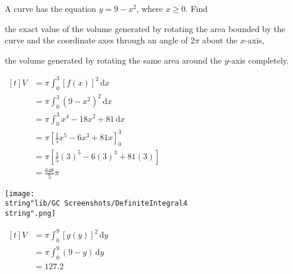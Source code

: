 \documentclass[11pt,a4paper]{book}
\begin{document}
\begin{example}

A curve has the equation $y=9-x^{2}$, where $x\geq0$. Find

\begin{tasks}[label=(\alph*),label-width=3.5ex]

\task the exact value of the volume generated by rotating the area
bounded by the curve and the coordinate axes through an angle of $2\pi$
about the $x$-axis,

\task the volume generated by rotating the same area around the $y$-axis
completely.

\end{tasks}

\Solution

\begin{tasks}[label=(\alph*),label-width=3.5ex]

\task
\begin{minipage}[t]{0.4\textwidth}
$
\begin{aligned}[t]
V & =\pi\int_{0}^{3}\left[f(x)\right]^{2}\,\mathrm{d}x\\
 & =\pi\int_{0}^{3}(9-x^{2})^{2}\,\mathrm{d}x\\
 & =\pi\int_{0}^{3}x^{4}-18x^{2}+81\,\mathrm{d}x\\
 & =\pi\left[\frac{1}{5}x^{5}-6x^{3}+81x\right]_{0}^{3}\\
 & =\pi\left[\frac{1}{5}(3)^{5}-6(3)^{3}+81(3)\right]\\
 & =\frac{648}{5}\pi
\end{aligned}
$

\end{minipage}
\begin{minipage}[t]{0.3\textwidth}

\begin{center}
\texttt{[image: \\string"lib/GC Screenshots/DefiniteIntegral4\\string".png]}
\par\end{center}

\end{minipage}

\task
$
\begin{aligned}[t]
V & =\pi\int_{0}^{9}\left[g(y)\right]^{2}\,\mathrm{d}y\\
 & =\pi\int_{0}^{9}(9-y)\,\mathrm{d}y\\
 & =127.2
\end{aligned}
$

\end{tasks}

\end{example}
\end{document}

